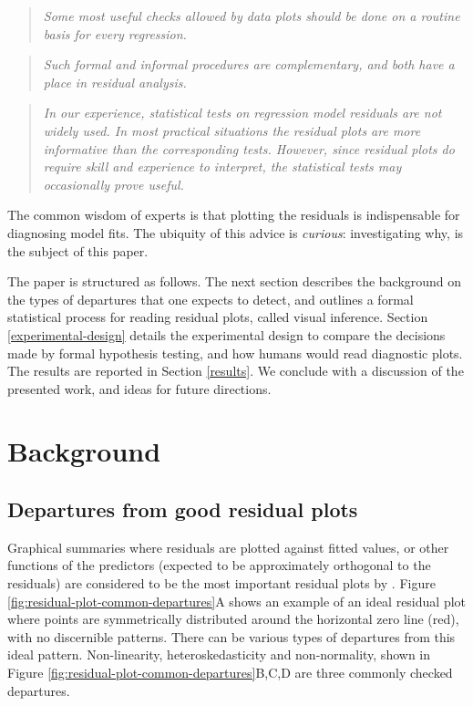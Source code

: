 \documentclass[]{interact}
\theoremstyle{plain}%
\theoremstyle{definition}
\theoremstyle{remark}
\begin{document}
\begin{quote}
\emph{Some most useful checks allowed by data plots should be done on a
routine basis for every regression.} \citep{draper1998applied}
\end{quote}

\begin{quote}
\emph{Such formal and informal procedures are complementary, and both
have a place in residual analysis.} \citep{cook1982residuals}
\end{quote}

\begin{quote}
\emph{In our experience, statistical tests on regression model residuals
are not widely used. In most practical situations the residual plots are
more informative than the corresponding tests. However, since residual
plots do require skill and experience to interpret, the statistical
tests may occasionally prove useful.} \citep{montgomery1982introduction}
\end{quote}

\noindent The common wisdom of experts is that plotting the residuals is
indispensable for diagnosing model fits. The ubiquity of this advice is
\emph{curious}: investigating why, is the subject of this paper.

The paper is structured as follows. The next section describes the
background on the types of departures that one expects to detect, and
outlines a formal statistical process for reading residual plots, called
visual inference. Section \ref{experimental-design} details the
experimental design to compare the decisions made by formal hypothesis
testing, and how humans would read diagnostic plots. The results are
reported in Section \ref{results}. We conclude with a discussion of the
presented work, and ideas for future directions.

\hypertarget{background}{%
\section{Background}\label{background}}

\hypertarget{departures-from-good-residual-plots}{%
\subsection{Departures from good residual
plots}\label{departures-from-good-residual-plots}}

Graphical summaries where residuals are plotted against fitted values,
or other functions of the predictors (expected to be approximately
orthogonal to the residuals) are considered to be the most important
residual plots by \citet{cook_applied_1999}. Figure
\ref{fig:residual-plot-common-departures}A shows an example of an ideal
residual plot where points are symmetrically distributed around the
horizontal zero line (red), with no discernible patterns. There can be
various types of departures from this ideal pattern. Non-linearity,
heteroskedasticity and non-normality, shown in Figure
\ref{fig:residual-plot-common-departures}B,C,D are three commonly
checked departures.
\end{document}
